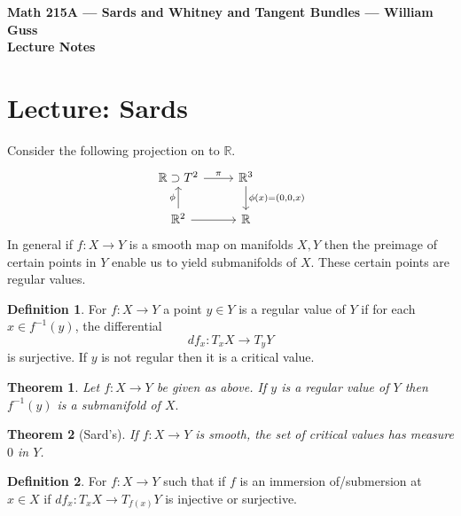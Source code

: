 \documentclass[11pt]{amsart}
\newtheorem{theorem}{Theorem}    %
\theoremstyle{definition}
\newtheorem{definition}{Definition}
\begin{document}
\begin{center}{\bf Math 215A --- Sards and Whitney and Tangent Bundles --- William Guss} \\ {\bf Lecture
Notes} \end{center}

\section{Lecture: Sards}

\medskip \noindent Consider the following projection on to $\mathbb{R}$.
\begin{equation*}
	\begin{tikzcd}
		\mathbb{R} \supset T^2 \arrow{r}{\pi} & \mathbb{R}^3 \arrow{d}{\phi(x) = (0,0,x)}\\
		\mathbb{R}^2 \arrow{u}{\phi} \arrow{r} & \mathbb{R}
	\end{tikzcd}
\end{equation*}
In general if $f: X \to Y$ is a smooth map on manifolds $X, Y$ then the preimage of certain  points in $Y$ enable us to yield submanifolds of $X$. These certain points are regular values.

\begin{definition}
	For $f: X \to Y$ a point $y \in Y$ is a regular value of $Y$ if for each $x \in f^{-1}(y)$, the differential
	\begin{equation*}
		df_x: T_x X \to T_y Y
	\end{equation*}
	is surjective. If $y$ is not regular then it is a critical value.
\end{definition}

\begin{theorem}
Let $f: X \to Y$ be given as above. If $y$ is a regular value of $Y$ then $f^{-1}(y)$ is a submanifold of $X.$
\end{theorem}

\begin{theorem}[Sard's] If $f: X \to Y$ is smooth, the set of critical values has measure $0$ in $Y$.
\end{theorem}

\begin{definition}
	For $f : X \to Y$ such that if $f$ is an immersion of/submersion at $x \in X$ if $df_x: T_x X \to T_{f(x)} Y$ is injective or surjective. 
\end{definition}
\end{document}
